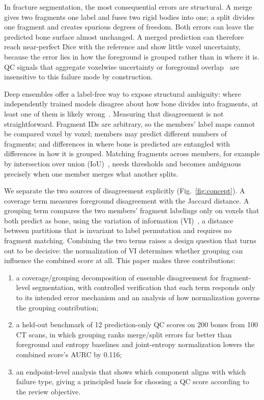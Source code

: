 \documentclass[conference]{IEEEtran}
\begin{document}
In fracture segmentation, the most consequential errors are structural. A merge gives two fragments one label and fuses two rigid bodies into one; a split divides one fragment and creates spurious degrees of freedom. Both errors can leave the predicted bone surface almost unchanged. A merged prediction can therefore reach near-perfect Dice with the reference and show little voxel uncertainty, because the error lies in how the foreground is grouped rather than in where it is. QC signals that aggregate voxelwise uncertainty or foreground overlap~\cite{roy2019,mehrtash2020,zenk2025} are insensitive to this failure mode by construction.

Deep ensembles offer a label-free way to expose structural ambiguity: where independently trained models disagree about how bone divides into fragments, at least one of them is likely wrong~\cite{lakshminarayanan2017}. Measuring that disagreement is not straightforward. Fragment IDs are arbitrary, so the members' label maps cannot be compared voxel by voxel; members may predict different numbers of fragments; and differences in where bone is predicted are entangled with differences in how it is grouped. Matching fragments across members, for example by intersection over union (IoU)~\cite{kirillov2019}, needs thresholds and becomes ambiguous precisely when one member merges what another splits.

We separate the two sources of disagreement explicitly (Fig.~\ref{fig:concept}). A coverage term measures foreground disagreement with the Jaccard distance. A grouping term compares the two members' fragment labelings only on voxels that both predict as bone, using the variation of information (VI)~\cite{meila2007}, a distance between partitions that is invariant to label permutation and requires no fragment matching. Combining the two terms raises a design question that turns out to be decisive: the normalization of VI determines whether grouping can influence the combined score at all. This paper makes three contributions:
\begin{enumerate}
\item a coverage/grouping decomposition of ensemble disagreement for fragment-level segmentation, with controlled verification that each term responds only to its intended error mechanism and an analysis of how normalization governs the grouping contribution;
\item a held-out benchmark of 12 prediction-only QC scores on 200 bones from 100 CT scans, in which grouping ranks merge/split errors far better than foreground and entropy baselines and joint-entropy normalization lowers the combined score's AURC by 0.116;
\item an endpoint-level analysis that shows which component aligns with which failure type, giving a principled basis for choosing a QC score according to the review objective.
\end{enumerate}
\end{document}
